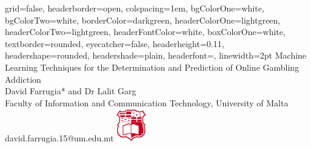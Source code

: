 \documentclass[a1paper,portrait,fontscale=0.43]{baposter}
\begin{document}

\begin{poster}
{
grid=false,
headerborder=open, %
colspacing=1em, %
bgColorOne=white, %
bgColorTwo=white, %
borderColor=darkgreen, %
headerColorOne=lightgreen, %
headerColorTwo=lightgreen, %
headerFontColor=white, %
boxColorOne=white, %
textborder=rounded, %
eyecatcher=false, %
headerheight=0.11\textheight, %
headershape=rounded, %
headershade=plain,
headerfont=\Large\textsf, %
linewidth=2pt %
}
{}
%
%
{
\textsf %
{Machine Learning Techniques for the Determination and Prediction of Online Gambling Addiction
}
} %
{\sf\vspace{0.5em}\\
David Farrugia* and Dr Lalit Garg
\vspace{0.1em}\\
\small{Faculty of Information and Communication Technology, University of Malta
\vspace{0.2em}\\
david.farrugia.15@um.edu.mt}
}
{\includegraphics[width=0.1\textwidth]{logo}} %



\end{poster}
\end{document}
